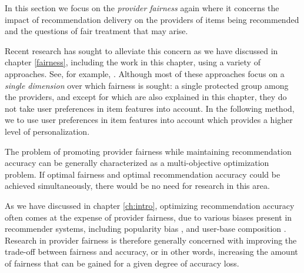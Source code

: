 \label{ch:ofair}


In this section we focus on the \textit{provider fairness} again where it concerns the impact of recommendation delivery on the providers of items being recommended and the questions of fair treatment that may arise\cite{burke2017multisided}.

Recent research has sought to alleviate this concern as we have discussed in chapter \ref{fairness}, including the work in this chapter, using a variety of approaches. See, for example, \cite{yao2017beyond,burke2018balanced,ekstrand2018exploring,liu2019personalized,kamishima2016model,beutel2019fairness}. Although most of these approaches focus on a \emph{single dimension} over which fairness is sought: a single protected group among the providers, and except for \cite{liu2019personalized,sonboli2020opportunistic} which are also explained in this chapter, they do not take user preferences in item features into account. In the following method, we to use user preferences in item features into account which provides a higher level of personalization.

The problem of promoting provider fairness while maintaining recommendation accuracy can be generally characterized as a multi-objective optimization problem. If optimal fairness and optimal recommendation accuracy could be achieved simultaneously, there would be no need for research in this area. 

As we have discussed in chapter \ref{ch:intro}, optimizing recommendation accuracy often comes at the expense of provider fairness, due to various biases present in recommender systems, including popularity bias \cite{celma2008hits,lee2014fairness}, and user-base composition \cite{lin2019crank, yao2017beyond}. Research in provider fairness is therefore generally concerned with improving the trade-off between fairness and accuracy, or in other words, increasing the amount of fairness that can be gained for a given degree of accuracy loss.


